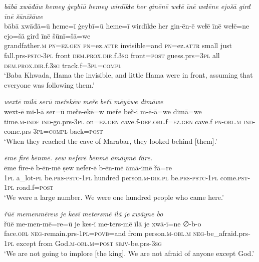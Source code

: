 \ea \label{BP.105}
\textit{bābā xwāđāw ħemey ġeybīū ħemey wirdīkɫe her ginēnē weɫē īnē weɫēne ejošā girđ īnē šūnīšāwe} \\ 
\gll bābā xwāđā=ū ħeme=ī ġeybī=ū ħeme=ī wirdīkɫe her gin-ēn-ē weɫē īnē weɫē=ne ejo=šā girđ īnē šūnī=šā=we \\ 
 grandfather\textsc{.m} \textsc{pn}\textsc{=ez.gen} \textsc{pn}=ez.\textsc{attr} invisible=and \textsc{pn}=ez.\textsc{attr} small just fall.prs\textsc{-pstc}\textsc{-3pl} front \textsc{dem.prox}\textsc{.dir}.f\textsc{.3sg} front\textsc{=\textsc{post}} guess.prs\textsc{=3pl} all \textsc{dem.prox}\textsc{.dir}.f\textsc{.3sg} track.f\textsc{=3pl}\textsc{=compl} \\ 
\glt `Baba Khwada, Hama the invisible, and little Hama were in front, assuming that everyone was following them.'
\z 
 
\ea \label{BP.106}
\textit{wextē milā serū meřekēw meře beřī mēyāwe dimāwe} \\ 
\gll wext-ē mi-l-ā ser=ū meře-ekē=w meře beř-ī m-ē-ā=we dimā=we \\ 
 time\textsc{.m}\textsc{-indf} \textsc{ind-}go.prs\textsc{-3pl} on\textsc{=ez.gen} cave.f\textsc{-def}\textsc{.obl}.f\textsc{=ez.gen} cave.f \textsc{pn}\textsc{-obl}\textsc{.m} \textsc{ind-}come.prs\textsc{-3pl}\textsc{=compl} back\textsc{=\textsc{post}} \\ 
\glt `When they reached the cave of Marabar, they looked behind [them].'
\z 
 
\ea \label{BP.110}
\textit{ēme firē bēnmē. ṣew neferē bēnmē āmāymē řāre.} \\ 
\gll ēme fire-ē b-ēn-mē ṣew nefer-ē b-ēn-mē āmā-īmē řā=re \\ 
 \textsc{1pl} a\_lot\textsc{-pl} be.\textsc{prs}\textsc{-pstc}\textsc{-\textsc{1pl}} hundred person\textsc{.m}\textsc{-dir.pl} be.\textsc{prs}\textsc{-pstc}\textsc{-\textsc{1pl}} come\textsc{.pst}-\textsc{1pl} road.f\textsc{=\textsc{post}} \\ 
\glt `We were a large number. We were one hundred  people who came here.'
\z 
 
\ea \label{BP.118}
\textit{řūē memenmērew je kesī metersmē īlā je xwāyne bo} \\ 
\gll řūē me-men-mē=re=ū je kes-ī me-ters-mē īlā je xwā-ī=ne ∅-b-o \\ 
 face\textsc{.obl} \textsc{neg-}remain.prs\textsc{-\textsc{1pl}}\textsc{=\textsc{povb}}=and from person\textsc{.m}\textsc{-obl}\textsc{.m} \textsc{neg-}be\_afraid.prs\textsc{-\textsc{1pl}} except from God\textsc{.m}\textsc{-obl}\textsc{.m}\textsc{=\textsc{post}} \textsc{sbjv-}be.prs\textsc{-3sg} \\ 
\glt `We are not going to implore [the king]. We are not afraid of anyone except God.'
\z 
 
